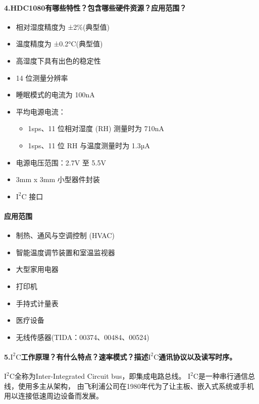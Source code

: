 \documentclass[a4paper]{ctexart}
\begin{document}
    \paragraph{4.HDC1080有哪些特性？包含哪些硬件资源？应用范围？}
    \begin{itemize}
      \item 相对湿度精度为 ±2\%(典型值)
      \item 温度精度为 ±0.2°C(典型值)
      \item 高湿度下具有出色的稳定性
      \item 14 位测量分辨率
      \item 睡眠模式的电流为 100nA
      \item 平均电源电流：
      \begin{itemize}
        \item 1sps、11 位相对湿度 (RH) 测量时为 710nA
        \item 1sps、11 位 RH 与温度测量时为 1.3µA
      \end{itemize}
      \item 电源电压范围：2.7V 至 5.5V
      \item 3mm x 3mm 小型器件封装
      \item $\mathrm{I^2C}$ 接口
    \end{itemize}
    \paragraph*{应用范围}
    \begin{itemize}
      \item 制热、通风与空调控制 (HVAC)
      \item 智能温度调节装置和室温监视器
      \item 大型家用电器
      \item 打印机
      \item 手持式计量表
      \item 医疗设备
      \item 无线传感器(TIDA：00374、00484、00524)
    \end{itemize}

    \paragraph{5.$\mathrm{I^2C}$工作原理？有什么特点？速率模式？描述$\mathrm{I^2C}$通讯协议以及读写时序。\\}
    \quad $\mathrm{I^2C}$全称为Inter-Integrated Circuit bus，即集成电路总线。
    $\mathrm{I^2C}$是一种串行通信总线，使用多主从架构，
    由飞利浦公司在1980年代为了让主板、嵌入式系统或手机用以连接低速周边设备而发展。
\end{document}
